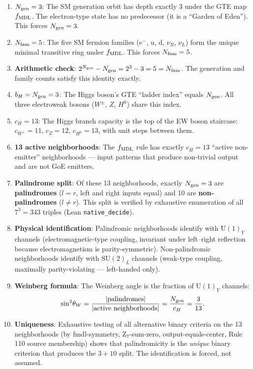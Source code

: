 \documentclass[11pt,a4paper]{article}
\newcommand{\term}[1]{\textbf{#1}}
\newcommand{\sinwsq}{\sin^2\!\theta_W}
\newcommand{\Ngen}{N_{\rm gen}}
\newcommand{\Nfam}{N_{\rm fam}}
\newcommand{\cH}{c_H}
\newcommand{\lean}[1]{\texttt{#1}}
\begin{document}
\medskip
\begin{tcolorbox}[colback=boxblue,colframe=blue!40!black,
  title=The 10-step derivation in plain language]
\begin{enumerate}
  \item \textbf{$\Ngen = 3$}: The SM generation orbit has depth exactly 3 under the
        GTE map $f_{\rm MDL}$.  The electron-type state has no predecessor (it is a
        ``Garden of Eden'').  This forces $\Ngen = 3$.
  \item \textbf{$\Nfam = 5$}: The five SM fermion families (e$^-$, u, d, $\nu_R$, $\nu_L$)
        form the unique minimal transitive ring under $f_{\rm MDL}$.  This forces $\Nfam = 5$.
  \item \textbf{Arithmetic check}: $2^{\Ngen} - \Ngen = 2^3 - 3 = 5 = \Nfam$.
        The generation and family counts satisfy this identity exactly.
  \item \textbf{$b_H = \Ngen = 3$}: The Higgs boson's GTE ``ladder index'' equals $\Ngen$.
        All three electroweak bosons ($W^{\pm}$, $Z$, $H^0$) share this index.
  \item \textbf{$\cH = 13$}: The Higgs branch capacity is the top of the EW boson
        staircase: $c_{W^+} = 11$, $c_Z = 12$, $c_{H^0} = 13$, with unit steps
        between them.
  \item \textbf{13 active neighborhoods}: The $f_{\rm MDL}$ rule has exactly $\cH = 13$
        ``active non-emitter'' neighborhoods — input patterns that produce non-trivial
        output and are not GoE emitters.
  \item \textbf{Palindrome split}: Of these 13 neighborhoods, exactly $\Ngen = 3$
        are \term{palindromes} ($l = r$, left and right inputs equal) and 10 are
        \term{non-palindromes} ($l \neq r$).  This split is verified by exhaustive
        enumeration of all $7^3 = 343$ triples (Lean \lean{native\_decide}).
  \item \textbf{Physical identification}: Palindromic neighborhoods identify with
        U$(1)_Y$ channels (electromagnetic-type coupling, invariant under left--right
        reflection because electromagnetism is parity-symmetric).  Non-palindromic
        neighborhoods identify with SU$(2)_L$ channels (weak-type coupling, maximally
        parity-violating — left-handed only).
  \item \textbf{Weinberg formula}: The Weinberg angle is the fraction of U$(1)_Y$
        channels:
        \[
          \sinwsq = \frac{|\text{palindromes}|}{|\text{active neighborhoods}|}
          = \frac{\Ngen}{\cH} = \frac{3}{13}.
        \]
  \item \textbf{Uniqueness}: Exhaustive testing of all alternative binary criteria
        on the 13 neighborhoods (by fmdl-symmetry, Z$_7$-sum-zero, output-equals-center,
        Rule 110 source membership) shows that palindromicity is the \emph{unique}
        binary criterion that produces the $3 + 10$ split.  The identification is
        forced, not assumed.
\end{enumerate}
\end{tcolorbox}
\end{document}
